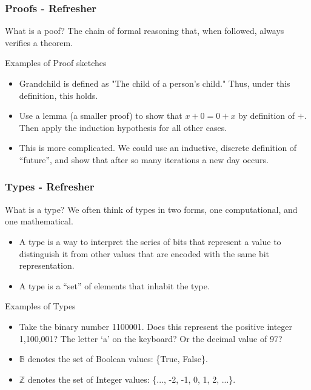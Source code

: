 \documentclass
  [hyperref={colorlinks = true,linkcolor = blue, 
             citecolor = blue, urlcolor = blue}
  ]{beamer}
\begin{document}
\begin{frame}[fragile]
  \frametitle{Proofs - Refresher}
  \begin{block}{What is a poof?}
    The chain of formal reasoning that, when followed, always verifies a
    theorem.
  \end{block}
  \begin{block}{Examples of Proof sketches}
    \begin{itemize}
      \item Grandchild is defined as "The child of a person's child." Thus,
      under this definition, this holds.
      \item Use a lemma (a smaller proof) to show that $x + 0 = 0 + x$ by
      definition of $+$. Then apply the induction hypothesis for all other
      cases.
      \item This is more complicated. We could use an inductive, discrete definition of
      ``future'', and show that after so many iterations a new day occurs.
    \end{itemize}
  \end{block}
\end{frame}

\begin{frame}[fragile]
  \frametitle{Types - Refresher}
  \begin{block}{What is a type?}
  We often think of types in two forms, one computational, and one
  mathematical.
    \begin{itemize}
      \item A type is a way to interpret the series of bits that represent a
      value to distinguish it from other values that are encoded with the same
      bit representation. 
      \item A type is a ``set'' of elements that inhabit the type.
    \end{itemize}
  \end{block}
  \begin{block}{Examples of Types}
    \begin{itemize}
      \item Take the binary number 1100001. Does this represent the positive
      integer 1,100,001? The letter `a' on the keyboard? Or the decimal value
      of 97?
      \item $\mathbb{B}$ denotes the set of Boolean values: \{True, False\}.
      \item $\mathbb{Z}$ denotes the set of Integer values: \{..., -2, -1, 0,
      1, 2, ...\}.
    \end{itemize}
  \end{block}
\end{frame}
\end{document}

